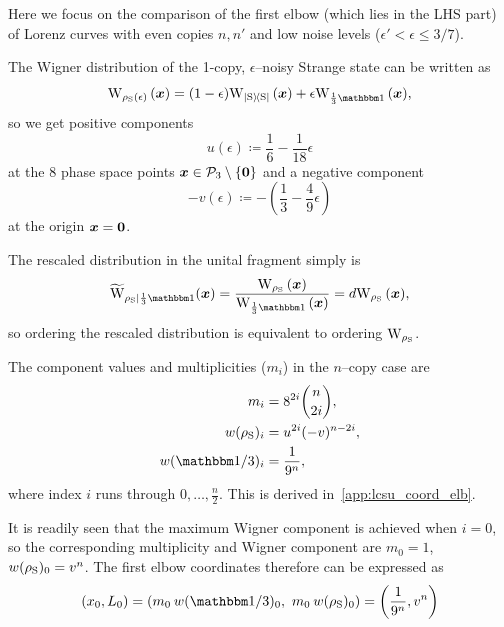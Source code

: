 \documentclass[pra,
aps,
twocolumn,
superscriptaddress,
groupedaddress,
nofootinbib,
reprint
]{revtex4-1}
\begin{document}
Here we focus on the comparison of the first elbow (which lies in the LHS part) of Lorenz curves with even copies $n, n'$ and low noise levels ($\epsilon' < \epsilon \leq 3/7$).

The Wigner distribution of the 1-copy, $\epsilon$--noisy Strange state can be written as 
\begin{equation}
	\W[\bmx]{\rho_{\rm{S}}(\epsilon)} = (1-\epsilon)\W[\bmx]{\ketbra{\rm{S}}} + \epsilon\W[\bmx]{\frac{1}{3}\id},
\end{equation}
so we get positive components
\begin{equation}
	u(\epsilon) \coloneqq \frac{1}{6} -\frac{1}{18}\epsilon
\end{equation}
at the 8 phase space points $\bm{x} \in \mathcal{P}_3 \setminus \{\bm{0}\}$ and a negative component
\begin{equation}
	- v(\epsilon) \coloneqq - \left( \frac{1}{3} -\frac{4}{9}\epsilon \right)
\end{equation}
at the origin $\bm{x} = \bm{0}$.

The rescaled distribution in the unital fragment simply is 
\begin{equation}
	\widetilde{\rm{W}}_{\rho_{\rm{S}}|\frac{1}{3}\id}(\bmx) = \frac{\W[\bmx]{\rho_{\rm{S}}}}{\W[\bmx]{\frac{1}{3}\id}} = d\W[\bmx]{\rho_{\rm{S}}},
\end{equation}
so ordering the rescaled distribution is equivalent to ordering $\W{\rho_{\rm{S}}}$.

The component values and multiplicities ($m_i$) in the $n$--copy case are 
\begin{align}
	m_i &= 8^{2i}\binom{n}{2i}, \\
	w(\rho_{\rm{S}})_i &= u^{2i}(-v)^{n-2i}, \\
	w(\id/3)_i &=  \frac{1}{9^n},
\end{align}
where index $i$ runs through $0,\dots,\frac{n}{2}$.
This is derived in~\cref{app:lcsu_coord_elb}.

It is readily seen that the maximum Wigner component is achieved when $i=0$, so the corresponding multiplicity and Wigner component are $m_0 = 1$, $w(\rho_{\rm{S}})_0 = v^n$.
The first elbow coordinates therefore can be expressed as
\begin{equation}\label{eq:first_elb_coords}
	(x_0, L_0) = (m_0\hspace{2pt} w(\id/3)_0,\ m_0\hspace{2pt} w(\rho_{\rm{S}})_0) = \left(\frac{1}{9^n}, v^n \right)
\end{equation}
\end{document}
